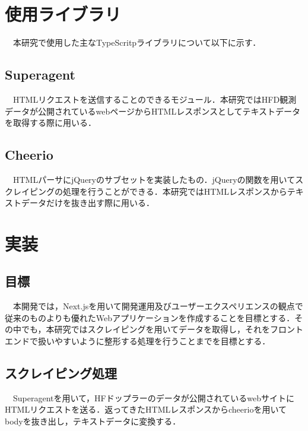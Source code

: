 \section{使用ライブラリ}
　本研究で使用した主なTypeScritpライブラリについて以下に示す．
\subsection{Superagent}

　HTMLリクエストを送信することのできるモジュール．本研究ではHFD観測データが公開されているwebページからHTMLレスポンスとしてテキストデータを取得する際に用いる．\cite{superagent}
\subsection{Cheerio}

　HTMLパーサにjQueryのサブセットを実装したもの．jQueryの関数を用いてスクレイピングの処理を行うことができる．本研究ではHTMLレスポンスからテキストデータだけを抜き出す際に用いる．\cite{cheerio}
\section{実装}
\subsection{目標}
　本開発では，Next.jsを用いて開発運用及びユーザーエクスペリエンスの観点で従来のものよりも優れたWebアプリケーションを作成することを目標とする．その中でも，本研究ではスクレイピングを用いてデータを取得し，それをフロントエンドで扱いやすいように整形する処理を行うことまでを目標とする．
\subsection{スクレイピング処理}
　Superagentを用いて，HFドップラーのデータが公開されているwebサイト\cite{hfd}にHTMLリクエストを送る．返ってきたHTMLレスポンスからcheerioを用いてbodyを抜き出し，テキストデータに変換する．

